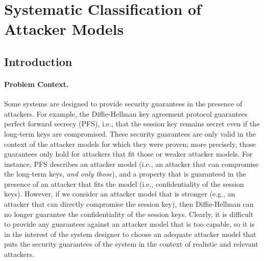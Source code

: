 \chapter{Systematic Classification of Attacker Models}
{\color{red}
\section{Introduction}
\label{sec:Introduction}
\subsubsection{Problem Context.} 
Some systems are designed to provide security guarantees in the presence of attackers. For example, the Diffie-Hellman key agreement protocol guarantees perfect forward secrecy \cite{Gunther1990,Menezes1996} (PFS), i.e., that the session key remains secret even if the long-term keys are compromised. These security guarantees are only valid in the context of the attacker models for which they were proven; more precisely, those guarantees only hold for attackers that fit those or weaker attacker models. For instance, PFS describes an attacker model (i.e., an attacker that can compromise the long-term keys, \emph{and only those}), and a property that is guaranteed in the presence of an attacker that fits the model (i.e., confidentiality of the session keys). However, if we consider an attacker model that is stronger (e.g., an attacker that can directly compromise the session key), then Diffie-Hellman can no longer guarantee the confidentiality of the session keys. Clearly, it is difficult to provide any guarantees against an attacker model that is too capable, so it is in the interest of the system designer to choose an adequate attacker model that puts the security guarantees of the system in the context of realistic and relevant attackers.

}
